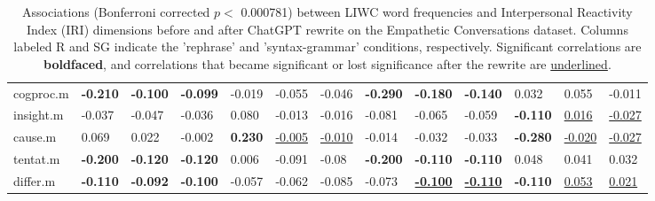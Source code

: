 \begin{table*}[ht]
{\begin{tabular}{l l l l|l l l|l l l|l l l}
cogproc.m & \textbf{-0.210} & \textbf{-0.100} & \textbf{-0.099}& -0.019 & -0.055 & -0.046 & \textbf{-0.290} & \textbf{-0.180} & \textbf{-0.140} & 0.032 & 0.055 & -0.011 \\
insight.m & -0.037 & -0.047 & -0.036& 0.080 & -0.013 & -0.016 & -0.081 & -0.065 & -0.059 & \textbf{-0.110} & \underline{0.016} & \underline{-0.027} \\
cause.m & 0.069 & 0.022 & -0.002& \textbf{0.230} & \underline{-0.005} & \underline{-0.010} & -0.014 & -0.032 & -0.033 & \textbf{-0.280} & \underline{-0.020} & \underline{-0.027} \\
tentat.m & \textbf{-0.200} & \textbf{-0.120} & \textbf{-0.120}& 0.006 & -0.091 & -0.08 & \textbf{-0.200} & \textbf{-0.110} & \textbf{-0.110} & 0.048 & 0.041 & 0.032 \\
differ.m & \textbf{-0.110} & \textbf{-0.092} & \textbf{-0.100}& -0.057 & -0.062 & -0.085 & -0.073 & \underline{\textbf{-0.100}} & \underline{\textbf{-0.110}} & \textbf{-0.110} & \underline{0.053} & \underline{0.021} \\
\bottomrule
\end{tabular}
}
\caption{Associations (Bonferroni corrected $p<$ 0.000781) between LIWC word frequencies and Interpersonal Reactivity Index (IRI) dimensions before and after ChatGPT rewrite on the Empathetic Conversations dataset. Columns labeled R and SG indicate the 'rephrase' and 'syntax-grammar' conditions, respectively. Significant correlations are \textbf{boldfaced}, and correlations that became significant or lost significance after the rewrite are \underline{underlined}.}
\label{tab:correlation_empathy}
\end{table*}